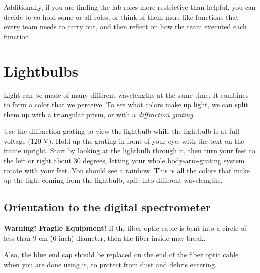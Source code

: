 Additionally, if you are finding the lab roles more restrictive than helpful, you can decide to co-hold some or all roles, or think of them more like functions that every team needs to carry out, and then reflect on how the team executed each function.

%

\section{Lightbulbs}

Light can be made of many different wavelengths at the same time. It combines to form a color that we perceive. To see what colors make up light, we can split them up with a triangular prism, or with a \textit{diffraction grating}.

\begin{steps}
	\item Use the diffraction grating to view the lightbulb while the lightbulb is at full voltage (120 V). Hold up the grating in front of your eye, with the text on the frame upright. Start by looking at the lightbulb through it, then turn your feet to the left or right about 30 degrees, letting your whole body-arm-grating system rotate with your feet. You should see a rainbow. This is all the colors that make up the light coming from the lightbulb, split into different wavelengths.
\end{steps}

\subsection{Orientation to the digital spectrometer}

\begin{framed}
	\textbf{Warning! Fragile Equipment!} If the fiber optic cable is bent into a circle of less than 9 cm (6 inch) diameter, then the fiber inside may break.
	
	Also, the blue end cap should be replaced on the end of the fiber optic cable when you are done using it, to protect from dust and debris entering.
\end{framed}

